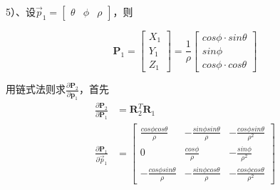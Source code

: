 \documentclass{article}
\begin{document}
5）、设$\vec{p}_1=
\left[
	\begin{matrix} 
		\theta & \phi & \rho 
	\end{matrix}
\right]$，则

\begin{equation}
	\boldsymbol{P}_1=
	\left[\begin{matrix}X_1  \\ 
		Y_1 \\
		Z_1
	\end{matrix}\right]
	=\frac{1}{\rho}  
	\left[
		\begin{matrix}
			cos\phi \cdot sin\theta \\
			sin\phi                 \\
			cos\phi \cdot cos\theta 
		\end{matrix}
	\right]
\end{equation}

用链式法则求$\frac{\partial{\boldsymbol{P}_2}}{\partial{\boldsymbol{p}_1}}$，首先
\begin{equation}
	\begin {aligned}
	\frac{\partial{\boldsymbol{P}_2}}{\partial{\boldsymbol{P}_1}}&=\boldsymbol{R}_2^{T}\boldsymbol{R}_1
	\\
	\frac{\partial{\boldsymbol{P}_1}}{\partial{\vec{p}_1}}&=
	\left[
		\begin{matrix}
			\frac{cos\phi cos\theta}{\rho}  & -\frac{sin\phi sin\theta}{\rho} & -\frac{cos\phi sin\theta}{\rho^2} \\
			0                               & \frac{cos\phi}{\rho}            & -\frac{sin\phi}{\rho^2}           \\
			-\frac{cos\phi sin\theta}{\rho} & -\frac{sin\phi cos\theta}{\rho} & -\frac{cos\phi cos\theta}{\rho^2} 
		\end{matrix}
	\right]
	\end{aligned}
\end{equation}
\end{document}
